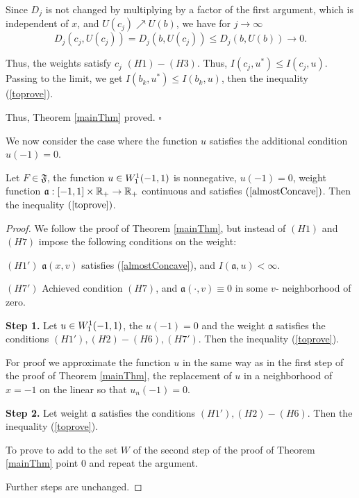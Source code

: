 Since $D_j$ is not changed by multiplying by a factor of the first argument, which is independent of $x$,
and $U(c_j) \nearrow U(b)$, we have for $j \to \infty$
$$D_j(c_j, U(c_j)) = D_j(b, U(c_j)) \le D_j(b, U(b)) \to 0.$$

Thus, the weights satisfy $c_j$ $(H1)-(H3)$.
Thus, $I(c_j, u^*) \le I(c_j, u)$.
Passing to the limit, we get $I(b_k, u^*) \le I(b_k, u)$, then the inequality (\ref{toprove}).

Thus, Theorem \ref{mainThm} proved.
\hfill $\square$

\medskip

We now consider the case where the function $u$ satisfies the additional condition $u(-1) = 0$.
\begin{thm}
Let $F \in \mathfrak{F}$, the function $u \in W_1^1(-1, 1)$ is nonnegative, $u(-1) = 0$,
weight function $\mathfrak a: [-1, 1] \times \mathbb R_+ \to \mathbb R_+$ continuous
and satisfies $(\ref{almostConcave})$.
Then the inequality $(\ref{toprove})$.
\end{thm}

\begin{proof}
We follow the proof of Theorem \ref{mainThm},
but instead of $(H1)$ and $(H7)$ impose the following conditions on the weight:

\bigskip
\noindent
$(H1')$ $\mathfrak a(x, v)$ satisfies (\ref{almostConcave}), and $I(\mathfrak a, u) < \infty$.

\bigskip
\noindent
$(H7')$ Achieved condition $(H7)$, and $\mathfrak a(\cdot, v) \equiv 0$ in some $v$- neighborhood of zero.

\bigskip
{\bf Step 1.} Let $u \in W_1^1(-1, 1)$, the $u(-1) = 0$ and the weight $\mathfrak a$ satisfies the conditions $(H1'), (H2)-(H6), (H7')$.
Then the inequality (\ref{toprove}).

For proof we approximate the function $u$ in the same way as in the first step of the proof of Theorem \ref{mainThm},
the replacement of $u$ in a neighborhood of $x = -1$ on the linear so that $u_n(-1) = 0$.

\bigskip
{\bf Step 2.} Let weight $\mathfrak a$ satisfies the conditions $(H1'), (H2)-(H6)$.
Then the inequality (\ref{toprove}).

To prove to add to the set $W$ of the second step of the proof of Theorem \ref{mainThm} point $0$
and repeat the argument.

\medskip

Further steps are unchanged.
\end{proof}

